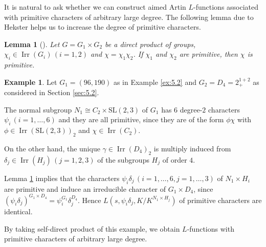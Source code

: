 \documentclass[a4paper,12pt]{article}
\newtheorem{lemma}[theorem]{Lemma}
\newtheorem{proposition}[theorem]{Proposition}
\theoremstyle{definition}
\newtheorem{example}[theorem]{Example}
\theoremstyle{remark}
\DeclareMathOperator{\irr}{Irr}
\numberwithin{equation}{section}
\begin{document}
It is natural to ask whether we can construct aimed Artin $L$-functions associated with 
primitive characters of arbitrary large degree.
The following lemma due to Hekster helps us to increase the degree of primitive characters.

\begin{lemma}[] \label{lem:5.2}
    Let $G=G_1 \times G_2$ be a direct product of groups, 
    $\chi_i \in \irr (G_i) \, (i=1,2)$ and $\chi = \chi_1 \chi_2$.
    If $\chi_1$ and $\chi_2$ are primitive, then $\chi$ is primitive.
\end{lemma}


\begin{example} \label{6}
Let $G_1 = (96,190)$ as in Example \ref{ex:5.2} and $G_2 = D_4 = 2^{1+2}_{+}$ as considered
in Section \ref{sec:5.2}. 

The normal subgroup $N_1 \cong C_2 \times \mathrm{SL}(2,3)$ of $G_1$ has 
$6$ degree-$2$ characters $\psi_i \, (i=1,\ldots , 6)$ and they are all primitive, since they are of the form $\phi \chi $
with $\phi \in \irr (\mathrm{SL}(2,3))_2$ and $\chi \in \irr (C_2)$.

On the other hand, the unique $\gamma \in \irr (D_4)_2$ is multiply induced from $\delta_j 
\in \irr (H_j) \, (j=1,2,3)$ of the subgroups $H_j$ of order $4$.

Lemma \ref{lem:5.2} implies that the characters $\psi_i \delta_j \, (i=1,\ldots ,6, j=1, \ldots, 3)$ 
of $N_1 \times H_i $ are primitive and induce an irreducible character of $G_1 \times D_4$, since 
$(\psi_i \delta_j)^{G_1 \times D_4} =  \psi_i^{G_1} \delta_j^{D_4}$.
Hence $L (s,\psi_i \delta_j,  K/K^{N_1 \times H_j})$ of primitive characters are identical.

By taking self-direct product of this example, 
we obtain $L$-functions with primitive characters of arbitrary large degree.
 \end{example}
\end{document}
